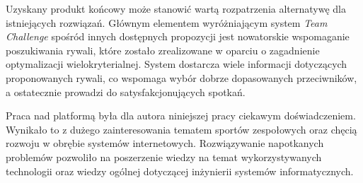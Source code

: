 Uzyskany produkt końcowy może stanowić wartą rozpatrzenia alternatywę dla istniejących rozwiązań. Głównym elementem wyróżniającym system \textit{Team Challenge} spośród innych dostępnych propozycji jest nowatorskie wspomaganie poszukiwania rywali, które zostało zrealizowane w oparciu o zagadnienie optymalizacji wielokryterialnej. System dostarcza wiele informacji dotyczących proponowanych rywali, co wspomaga wybór dobrze dopasowanych przeciwników, a ostatecznie prowadzi do satysfakcjonujących spotkań. %

Praca nad platformą była dla autora niniejszej pracy ciekawym doświadczeniem. Wynikało to z dużego zainteresowania tematem sportów zespołowych oraz chęcią rozwoju w obrębie systemów internetowych. Rozwiązywanie napotkanych problemów pozwoliło na poszerzenie wiedzy na temat wykorzystywanych technologii oraz wiedzy ogólnej dotyczącej inżynierii systemów informatycznych.






